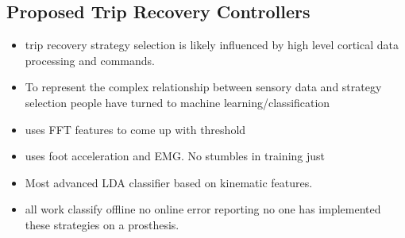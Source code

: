 \subsection{Proposed Trip Recovery Controllers}

\begin{itemize}
    \item trip recovery strategy selection is likely influenced by high level
    cortical data processing and commands.
    \item To represent the complex relationship between sensory data and
    strategy selection people have turned to machine learning/classification
    \item \citep{lawson2010stumble} uses FFT features to come up with threshold
    \item \citep{zhang2011towards} uses foot acceleration and EMG. No stumbles
    in training just 
    \item \citep{shirota2014recovery} Most advanced LDA classifier based on
    kinematic features. 
    \item all work classify offline no online error reporting no one has
    implemented these strategies on a prosthesis.
\end{itemize}
